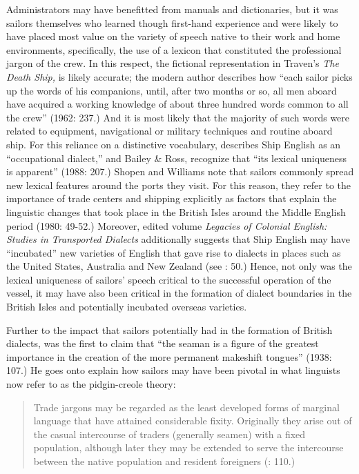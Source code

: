 Administrators may have benefitted from manuals and dictionaries, but it was sailors themselves who learned though first-hand experience and were likely to have placed most value on the variety of speech native to their work and home environments, specifically, the use of a lexicon that constituted the professional jargon of the crew. In this respect, the fictional representation in Traven’s \textit{The Death Ship,} is likely accurate; the modern author describes how “each sailor picks up the words of his companions, until, after two months or so, all men aboard have acquired a working knowledge of about three hundred words common to all the crew” (1962: 237.) And it is most likely that the majority of such words were related to equipment, navigational or military techniques and routine aboard ship. For this reliance on a distinctive vocabulary, \citet{Hancock1986} describes Ship English as an “occupational dialect,” and Bailey \& Ross, recognize that “its lexical uniqueness is apparent” (1988: 207.) Shopen and Williams note that sailors commonly spread new lexical features around the ports they visit. For this reason, they refer to the importance of trade centers and shipping explicitly as factors that explain the linguistic changes that took place in the British Isles around the Middle English period (1980: 49-52.) Moreover,  edited volume \textit{Legacies of Colonial English: Studies in Transported Dialects} additionally suggests that Ship English may have “incubated” new varieties of English that gave rise to dialects in places such as the United States, Australia and New Zealand (see \citealt{Hickey2004}: 50.) Hence, not only was the lexical uniqueness of sailors’ speech critical to the successful operation of the vessel, it may have also been critical in the formation of dialect boundaries in the British Isles and potentially incubated overseas varieties.

Further to the impact that sailors potentially had in the formation of British dialects, \citet{Reinecke1938} was the first to claim that “the seaman is a figure of the greatest importance in the creation of the more permanent makeshift tongues” (1938: 107.) He goes onto explain how sailors may have been pivotal in what linguists now refer to as the pidgin-creole theory:

\begin{quotation}
Trade jargons may be regarded as the least developed forms of marginal language that have attained considerable fixity. Originally they arise out of the casual intercourse of traders (generally seamen) with a fixed population, although later they may be extended to serve the intercourse between the native population and resident foreigners (\citealt{Reinecke1938}: 110.) \end{quotation}

